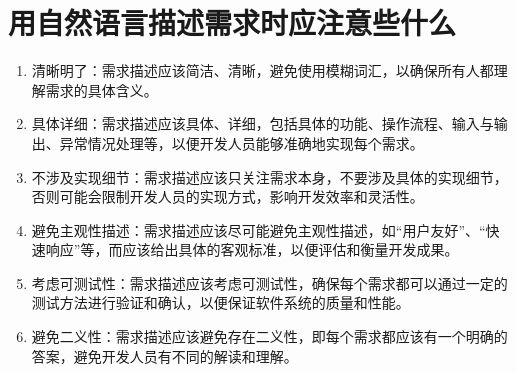 \documentclass[11pt, a4paper, oneside]{ctexbook}
\begin{document}
\section{用自然语言描述需求时应注意些什么}
\begin{enumerate}
    \item 清晰明了：需求描述应该简洁、清晰，避免使用模糊词汇，以确保所有人都理解需求的具体含义。
    \item 具体详细：需求描述应该具体、详细，包括具体的功能、操作流程、输入与输出、异常情况处理等，以便开发人员能够准确地实现每个需求。
    \item 不涉及实现细节：需求描述应该只关注需求本身，不要涉及具体的实现细节，否则可能会限制开发人员的实现方式，影响开发效率和灵活性。
    \item 避免主观性描述：需求描述应该尽可能避免主观性描述，如“用户友好”、“快速响应”等，而应该给出具体的客观标准，以便评估和衡量开发成果。
    \item 考虑可测试性：需求描述应该考虑可测试性，确保每个需求都可以通过一定的测试方法进行验证和确认，以便保证软件系统的质量和性能。
    \item 避免二义性：需求描述应该避免存在二义性，即每个需求都应该有一个明确的答案，避免开发人员有不同的解读和理解。
\end{enumerate}
\end{document}
